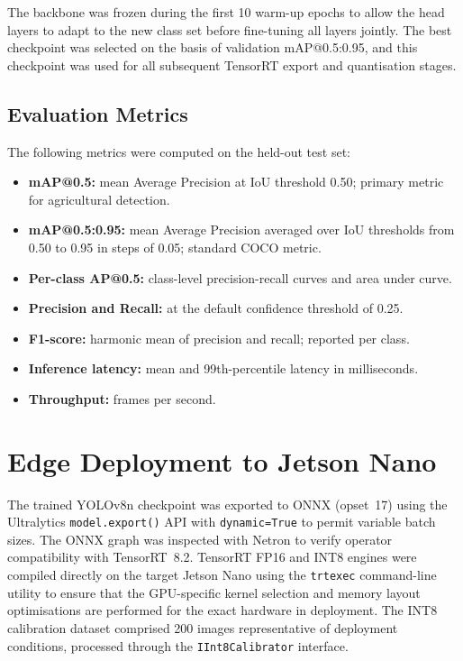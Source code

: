 \documentclass[12pt,a4paper]{report}
\begin{document}
The backbone was frozen during the first 10 warm-up epochs to allow the head layers to adapt to the new class set before fine-tuning all layers jointly. The best checkpoint was selected on the basis of validation mAP@0.5:0.95, and this checkpoint was used for all subsequent TensorRT export and quantisation stages.

\subsection{Evaluation Metrics}

The following metrics were computed on the held-out test set:
\begin{itemize}
    \item \textbf{mAP@0.5:} mean Average Precision at IoU threshold 0.50; primary metric for agricultural detection.
    \item \textbf{mAP@0.5:0.95:} mean Average Precision averaged over IoU thresholds from 0.50 to 0.95 in steps of 0.05; standard COCO metric.
    \item \textbf{Per-class AP@0.5:} class-level precision-recall curves and area under curve.
    \item \textbf{Precision and Recall:} at the default confidence threshold of 0.25.
    \item \textbf{F1-score:} harmonic mean of precision and recall; reported per class.
    \item \textbf{Inference latency:} mean and 99th-percentile latency in milliseconds.
    \item \textbf{Throughput:} frames per second.
\end{itemize}

\section{Edge Deployment to Jetson Nano}

The trained YOLOv8n checkpoint was exported to ONNX (opset~17) using the Ultralytics \texttt{model.export()} API with \texttt{dynamic=True} to permit variable batch sizes. The ONNX graph was inspected with Netron to verify operator compatibility with TensorRT~8.2. TensorRT FP16 and INT8 engines were compiled directly on the target Jetson Nano using the \texttt{trtexec} command-line utility to ensure that the GPU-specific kernel selection and memory layout optimisations are performed for the exact hardware in deployment. The INT8 calibration dataset comprised 200 images representative of deployment conditions, processed through the \texttt{IInt8Calibrator} interface.
\end{document}
